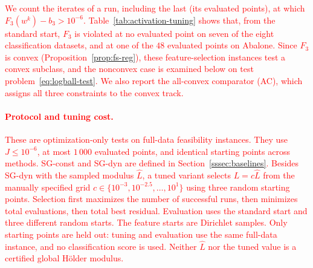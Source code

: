 \documentclass[]{interact}
\theoremstyle{plain}
\theoremstyle{definition}
\theoremstyle{remark}
\begin{document}
\leavevmode\textcolor{red}{We count the iterates of a run, including the last (its evaluated points), at which $F_3(w^k)-b_3>10^{-6}$. Table~\ref{tab:activation-tuning} shows that, from the standard start, $F_3$ is violated at no evaluated point on seven of the eight classification datasets, and at one of the $48$ evaluated points on Abalone. Since $F_3$ is convex (Proposition~\ref{prop:fs-reg}), these feature-selection instances test a convex subclass, and the nonconvex case is examined below on test problem~\eqref{eq:logball-test}. We also report the all-convex comparator (AC), which assigns all three constraints to the convex track.}

\paragraph*{\textcolor{red}{Protocol and tuning cost.}}
\leavevmode\textcolor{red}{These are optimization-only tests on full-data feasibility instances. They use $J\le10^{-6}$, at most $1\,000$ evaluated points, and identical starting points across methods. SG-const and SG-dyn are defined in Section~\ref{sssec:baselines}. Besides SG-dyn with the sampled modulus $\widehat L$, a tuned variant selects $L=c\widehat L$ from the manually specified grid $c\in\{10^{-3},10^{-2.5},\ldots,10^1\}$ using three random starting points. Selection first maximizes the number of successful runs, then minimizes total evaluations, then total best residual. Evaluation uses the standard start and three different random starts. The feature starts are Dirichlet samples. Only starting points are held out: tuning and evaluation use the same full-data instance, and no classification score is used. Neither $\widehat L$ nor the tuned value is a certified global H\"older modulus.}
\end{document}

